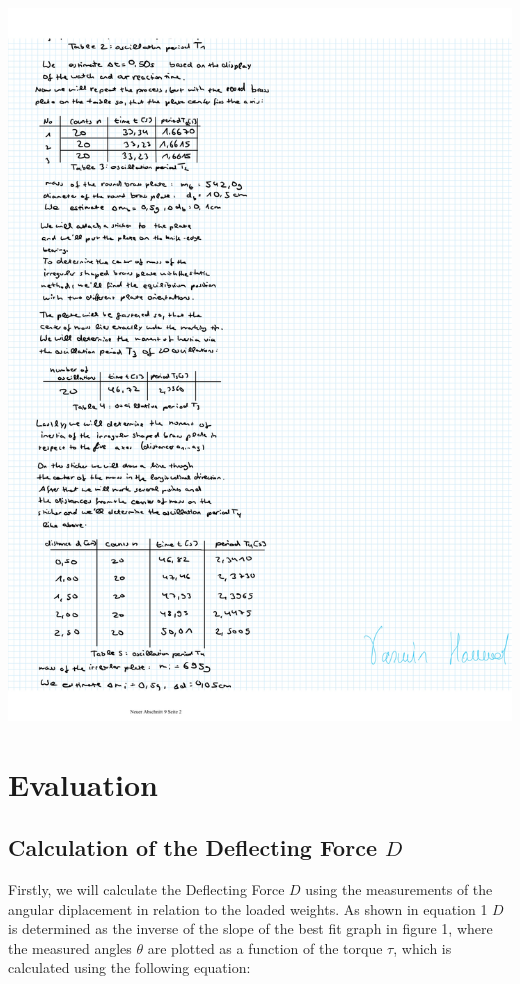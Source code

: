 \documentclass{article}
\begin{document}
\includegraphics[width=\textwidth]{graphics/mess2.jpg}
\newpage
\addtocounter{table}{5}

\section{Evaluation}

\subsection{Calculation of the Deflecting Force $D$}

Firstly, we will calculate the Deflecting Force $D$ using the measurements of the angular diplacement in relation to the loaded weights. As shown in equation 1 $D$ is determined as the inverse of the slope of the best fit graph in figure 1, where the measured angles $\theta$ are plotted as a function of the torque $\tau$, which is calculated using the following equation:
\end{document}
